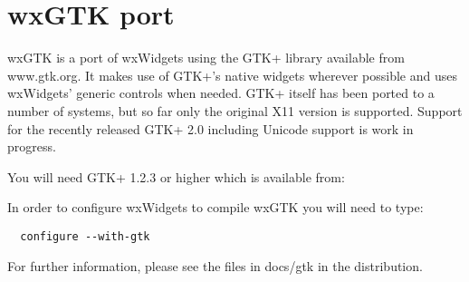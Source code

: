 \section{wxGTK port}\label{wxgtkport}

wxGTK is a port of wxWidgets using the GTK+ library available
from www.gtk.org. It makes use of GTK+'s native widgets wherever
possible and uses wxWidgets' generic controls when needed. GTK+
itself has been ported to a number of systems, but so far only the
original X11 version is supported. Support for the recently released
GTK+ 2.0 including Unicode support is work in progress.

You will need GTK+ 1.2.3 or higher which is available from:


In order to configure wxWidgets to compile wxGTK you will 
need to type:

\begin{verbatim}
  configure --with-gtk
\end{verbatim}

For further information, please see the files in docs/gtk
in the distribution.


